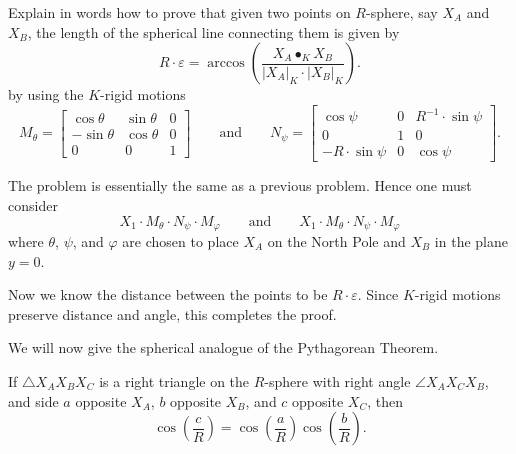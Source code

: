 \documentclass{ximera}
\begin{document}
\begin{problem}
  Explain in words how to prove that given two points on $R$-sphere,
  say $X_A$ and $X_B$, the length of the spherical line connecting them
  is given by
  \[
  R\cdot \varepsilon = \arccos\left(\frac{X_A\bullet_K X_B}{|X_A|_K\cdot |X_B|_K}\right).
  \]
  by using the $K$-rigid motions
  \[
   M_\theta=
  \begin{bmatrix}
    \cos\theta & \sin\theta & 0\\
    -\sin\theta & \cos\theta & 0\\
    0 & 0 & 1
  \end{bmatrix}
  \qquad\text{and}\qquad
  N_\psi=
  \begin{bmatrix}
    \cos\psi & 0 & R^{-1}\cdot\sin\psi\\
    0 & 1 & 0\\
    -R\cdot\sin\psi & 0 & \cos\psi
  \end{bmatrix}.
  \]
  \begin{freeResponse}
    The problem is essentially the same as a previous problem. Hence one must consider
    \[
    X_1\cdot M_\theta\cdot N_\psi\cdot M_\varphi \qquad\text{and}\qquad
    X_1\cdot M_\theta\cdot N_\psi\cdot M_\varphi
    \]
    where $\theta$, $\psi$, and $\varphi$ are chosen to place $X_A$ on
    the North Pole and $X_B$ in the plane $y=0$.

    Now we know the distance between the points to be $R\cdot
    \varepsilon$. Since $K$-rigid motions preserve distance and angle,
    this completes the proof.
  \end{freeResponse}
\end{problem}


We will now give the spherical analogue of the Pythagorean Theorem.

\begin{theorem}
  If $\triangle X_AX_BX_C$ is a right triangle on the $R$-sphere with right
  angle $\angle X_AX_CX_B$, and side $a$ opposite $X_A$, $b$ opposite $X_B$,
  and $c$ opposite $X_C$, then
  \[
\cos\left(\frac{c}{R}\right)=\cos\left(\frac{a}{R}\right)\cos\left(\frac{b}{R}\right).
  \]
\end{theorem}
\end{document}
